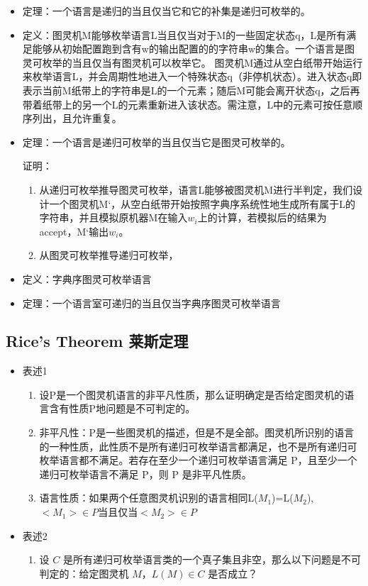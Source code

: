 \documentclass[UTF8]{ctexart}
\begin{document}
\begin{itemize}
    \item 定理：一个语言是递归的当且仅当它和它的补集是递归可枚举的。
    \item 定义：图灵机M能够枚举语言L当且仅当对于M的一些固定状态q，L是所有满足能够从初始配置跑到含有w的输出配置的的字符串w的集合。一个语言是图灵可枚举的当且仅当有图灵机可以枚举它。
    图灵机M通过从空白纸带开始运行来枚举语言L，并会周期性地进入一个特殊状态q（非停机状态）。进入状态q即表示当前M纸带上的字符串是L的一个元素；随后M可能会离开状态q，之后再带着纸带上的另一个L的元素重新进入该状态。需注意，L中的元素可按任意顺序列出，且允许重复。
    \item 定理：一个语言是递归可枚举的当且仅当它是图灵可枚举的。
    
    证明：
    \begin{enumerate}
        \item 从递归可枚举推导图灵可枚举，语言L能够被图灵机M进行半判定，我们设计一个图灵机M‘，从空白纸带开始按照字典序系统性地生成所有属于L的字符串，并且模拟原机器M在输入$w_i$上的计算，若模拟后的结果为accept，M‘输出$w_i$。
        \item 从图灵可枚举推导递归可枚举，
    \end{enumerate}
    
    \item 定义：字典序图灵可枚举语言
    \item 定理：一个语言室可递归的当且仅当字典序图灵可枚举语言

\end{itemize}

\subsection{Rice's Theorem 莱斯定理}

\begin{itemize}
    \item 表述1
    \begin{enumerate}
        \item 设P是一个图灵机语言的非平凡性质，那么证明确定是否给定图灵机的语言含有性质P地问题是不可判定的。

        \item 非平凡性：P是一些图灵机的描述，但是不是全部。图灵机所识别的语言的一种性质，此性质不是所有递归可枚举语言都满足，也不是所有递归可枚举语言都不满足。若存在至少一个递归可枚举语言满足 P，且至少一个递归可枚举语言不满足 P，则 P 是非平凡性质。

        \item 语言性质：如果两个任意图灵机识别的语言相同L($M_1$)=L($M_2$),$<M_1> \in P$当且仅当$<M_2> \in P$ 
    \end{enumerate}
    \item 表述2
    \begin{enumerate}
        \item 设 \( C \) 是所有递归可枚举语言类的一个真子集且非空，那么以下问题是不可判定的：给定图灵机 \( M \)，\( L(M) \in C \) 是否成立？
    \end{enumerate}
\end{itemize}
\end{document}
